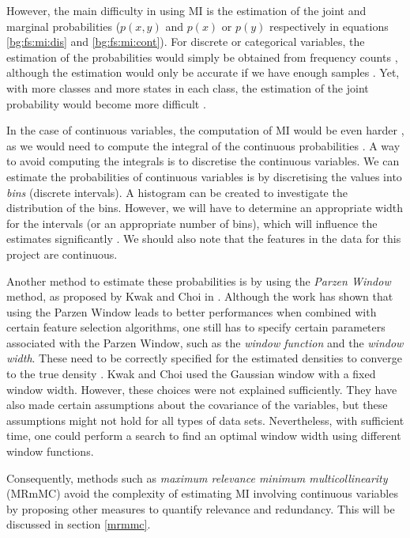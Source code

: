 \documentclass[12pt, twoside, a4paper]{report}
\begin{document}
However, the main difficulty in using MI is the estimation of the joint and marginal probabilities ($p(x, y)$ and $p(x)$ or $p(y)$ respectively in equations \ref{bg:fs:mi:dis} and \ref{bg:fs:mi:cont}). For discrete or categorical variables, the estimation of the probabilities would simply be obtained from frequency counts \cite{RefWorks:183}, although the estimation would only be accurate if we have enough samples \cite{RefWorks:182}. Yet, with more classes and more states in each class, the estimation of the joint probability would become more difficult \cite{RefWorks:140}.

In the case of continuous variables, the computation of MI would be even harder \cite{RefWorks:185}, as we would need to compute the integral of the continuous probabilities \cite{RefWorks:192}. A way to avoid computing the integrals is to discretise the continuous variables. We can estimate the probabilities of continuous variables is by discretising the values into \textit{bins} (discrete intervals). A histogram can be created to investigate the distribution of the bins. However, we will have to determine an appropriate width for the intervals (or an appropriate number of bins), which will influence the estimates significantly \cite{RefWorks:186}. We should also note that the features in the data for this project are continuous. 

Another method to estimate these probabilities is by using the \textit{Parzen Window} method, as proposed by Kwak and Choi in \cite{RefWorks:183}. Although the work has shown that using the Parzen Window leads to better performances when combined with certain feature selection algorithms, one still has to specify certain parameters associated with the Parzen Window, such as the \textit{window function} and the \textit{window width}. These need to be correctly specified for the estimated densities to converge to the true density \cite{RefWorks:184}. Kwak and Choi used the Gaussian window with a fixed window width. However, these choices were not explained sufficiently. They have also made certain assumptions about the covariance of the variables, but these assumptions might not hold for all types of data sets. Nevertheless, with sufficient time, one could perform a search to find an optimal window width using different window functions.

Consequently, methods such as \textit{maximum relevance minimum multicollinearity} (MRmMC) \cite{RefWorks:187} avoid the complexity of estimating MI involving continuous variables by proposing other measures to quantify relevance and redundancy. This will be discussed in section \ref{mrmmc}.
\end{document}
